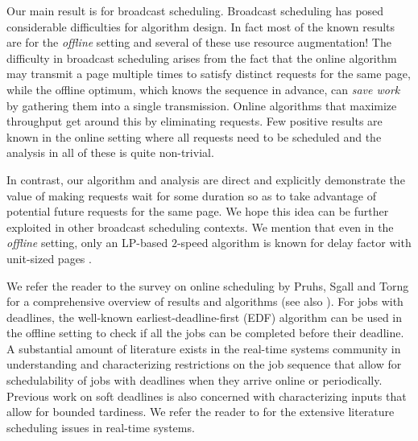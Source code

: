 \documentclass[11pt]{article}
\newcommand{\eps}{\epsilon}
\begin{document}
Our main result is for broadcast scheduling. Broadcast scheduling has
posed considerable difficulties for algorithm design. In fact most of
the known results are for the {\em offline} setting
\cite{KalyanasundaramPV00,ErlebachH02,GandhiKKW04,GandhiKPS06,BansalCS06,BansalCKN05}
and several of these use resource augmentation! The difficulty in
broadcast scheduling arises from the fact that the online algorithm
may transmit a page multiple times to satisfy distinct requests for
the same page, while the offline optimum, which knows the sequence in
advance, can {\em save work} by gathering them into a single
transmission. Online algorithms that maximize throughput
\cite{Kimc04,ChanLTW04,ZhengFCCPW06,ChrobakDJKK06} get around this by
eliminating requests. Few positive results are known in the online
setting where all requests need to be scheduled
\cite{BartalM00,EdmondsP03,EdmondsP04} and the analysis in all of
these is quite non-trivial.
\iffalse
Only two online results are of known for metrics
that require all requests to be scheduled. One is for maximum response
time where a factor of $2$ is shown for FIFO (first-in first-out)
\cite{BartalM00,ChangEGK08}. The other is a $(4+\eps)$-speed
$O(1/\eps)$-competitive algorithm for average response time by Edmonds
and Pruhs \cite{EdmondsP03}; their algorithm is an indirect reduction
to a complicated algorithm of Edmonds \cite{Edmonds00} for
non-clairvoyant scheduling.
\fi
In contrast, our algorithm and analysis
are direct and explicitly demonstrate the value of making requests
wait for some duration so as to take advantage of potential future
requests for the same page. We hope this idea can be further exploited
in other broadcast scheduling contexts. We mention that even in the
{\em offline} setting, only an LP-based $2$-speed algorithm is known
for delay factor with unit-sized pages \cite{ChangEGK08}.

\medskip
{} We refer the reader to the survey on
online scheduling by Pruhs, Sgall and Torng \cite{PruhsST} for a
comprehensive overview of results and algorithms (see also
\cite{Pruhs07}). For jobs with deadlines, the well-known
earliest-deadline-first (EDF) algorithm can be used in the offline
setting to check if all the jobs can be completed before their
deadline. A substantial amount of literature exists in the real-time
systems community in understanding and characterizing restrictions on
the job sequence that allow for schedulability of jobs with deadlines
when they arrive online or periodically. Previous work on soft
deadlines is also concerned with characterizing inputs that allow for
bounded tardiness. We refer the reader to
\cite{RealtimeHandbook} for the extensive literature
scheduling issues in real-time systems.
\end{document}
